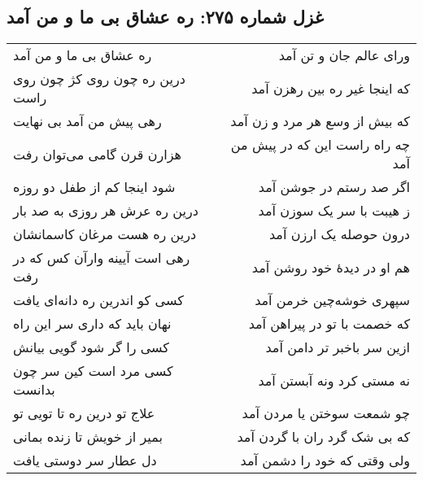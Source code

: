 \begin{center}
\section*{غزل شماره ۲۷۵: ره عشاق بی ما و من آمد}
\label{sec:275}
\begin{longtable}{l p{0.5cm} r}
ره عشاق بی ما و من آمد
&&
ورای عالم جان و تن آمد
\\
درین ره چون روی کژ چون روی راست
&&
که اینجا غیر ره بین رهزن آمد
\\
رهی پیش من آمد بی نهایت
&&
که بیش از وسع هر مرد و زن آمد
\\
هزارن قرن گامی می‌توان رفت
&&
چه راه راست این که در پیش من آمد
\\
شود اینجا کم از طفل دو روزه
&&
اگر صد رستم در جوشن آمد
\\
درین ره عرش هر روزی به صد بار
&&
ز هیبت با سر یک سوزن آمد
\\
درین ره هست مرغان کاسمانشان
&&
درون حوصله یک ارزن آمد
\\
رهی است آیینه وارآن کس که در رفت
&&
هم او در دیدهٔ خود روشن آمد
\\
کسی کو اندرین ره دانه‌ای یافت
&&
سپهری خوشه‌چین خرمن آمد
\\
نهان باید که داری سر این راه
&&
که خصمت با تو در پیراهن آمد
\\
کسی را گر شود گویی بیانش
&&
ازین سر باخبر تر دامن آمد
\\
کسی مرد است کین سر چون بدانست
&&
نه مستی کرد ونه آبستن آمد
\\
علاج تو درین ره تا تویی تو
&&
چو شمعت سوختن یا مردن آمد
\\
بمیر از خویش تا زنده بمانی
&&
که بی شک گرد ران با گردن آمد
\\
دل عطار سر دوستی یافت
&&
ولی وقتی که خود را دشمن آمد
\\
\end{longtable}
\end{center}
